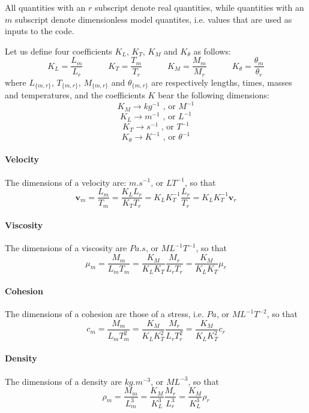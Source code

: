 All quantities with an $r$ subscript denote real quantities, while quantities with 
an $m$ subscript denote dimensionless model quantites, i.e. values that are used as inputs to the code.

Let us define four coefficients $K_L$, $K_T$, $K_M$ and $K_\theta$ as follows:
\begin{equation}
K_L=\frac{L_m}{L_r}
\quad\quad\quad
K_T=\frac{T_m}{T_r}
\quad\quad\quad
K_M=\frac{M_m}{M_r}
\quad\quad\quad
K_\theta=\frac{\theta_m}{\theta_r}
\label{eqkkk}
\end{equation}
where $L_{\{m,r\}}$, $T_{\{m,r\}}$, $M_{\{m,r\}}$ and $\theta_{\{m,r\}}$ are respectively lengths, times, masses and temperatures, and the coefficients $K$ bear the following dimensions:
\[
K_M \rightarrow kg^{-1} \mbox{ , or } M^{-1}
\]
\[
K_L \rightarrow m^{-1} \mbox{ , or } L^{-1}
\]
\[
K_T \rightarrow s^{-1} \mbox{ , or } T^{-1}
\]
\[
K_\theta \rightarrow K^{-1} \mbox{ , or } \theta^{-1}
\]

\paragraph{Velocity}

The dimensions of a velocity are: $m.s^{-1}$, or $LT^{-1}$, so that
\begin{equation}
{\bm v}_m = \frac{L_m}{T_m} = \frac{K_L L_r}{K_T T_r} = K_L K_T^{-1} \frac{L_r}{T_r} = K_L K_T^{-1} {\bm v}_r  
\label{eqvel}
\end{equation}


\paragraph{Viscosity} The dimensions of a viscosity are $Pa.s$, or $ML^{-1}T^{-1}$, so that
\begin{equation}
\mu_m=\frac{M_m}{L_mT_m}=\frac{K_M}{K_LK_T}\frac{M_r}{L_rT_r}=\frac{K_M}{K_LK_T} \mu_r
\label{eqmu}
\end{equation}


\paragraph{Cohesion} The dimensions of a cohesion are those of a stress, i.e. $Pa$, or $ML^{-1}T^{-2}$, so that
\[
c_m=\frac{M_m}{L_mT_m^2}=\frac{K_M}{K_LK_T^2}\frac{M_r}{L_rT_r^2}=\frac{K_M}{K_LK_T^2} c_r
\]

\paragraph{Density} The dimensions of a density are $kg.m^{-3}$, or $ML^{-3}$, so that
\[
\rho_m=\frac{M_m}{L^3_m}=\frac{K_M}{K_L^3}\frac{M_r}{L^3_r}=\frac{K_M}{K_L^3} \rho_r
\]

